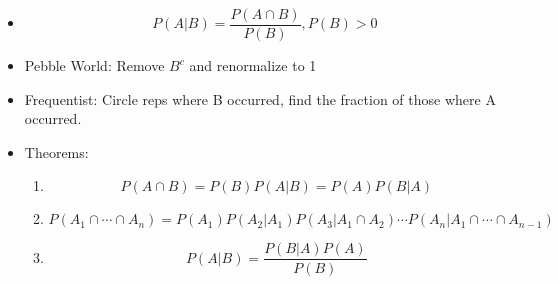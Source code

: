 \documentclass[11pt, oneside]{article}   	%
\begin{document}
\begin{itemize}
\begin{itemize}
					\item 
						\[
							P(A|B) = \frac{P(A \cap B)}{P(B)}, P(B) > 0
						\]
					\item Pebble World: Remove $B^{c}$ and renormalize to 1
					\item Frequentist: Circle reps where B occurred, find the fraction of those where A occurred. 
					\item Theorems:
						\begin{enumerate}
							\item
								\[
									P(A \cap B) = P(B) P(A|B) = P(A) P(B|A)
								\]
							\item
								\[ 
									P(A_1 \cap \cdots \cap A_n) = P(A_1)P(A_2|A_1)P(A_3|A_1 \cap A_2) \cdots P(A_n|A_1 \cap \cdots \cap A_{n-1})
								\]
							\item 
								\[ 
									P(A|B) = \frac{P(B|A) P(A)}{P(B)}
								\]
						\end{enumerate}
				\end{itemize}
				
		\end{itemize}
\end{document}
